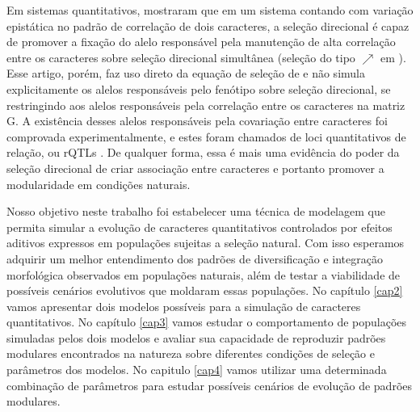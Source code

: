 Em sistemas quantitativos, \cite{Pavlicev2010} mostraram que em um
sistema contando com variação epistática no padrão de correlação de dois
caracteres, a seleção direcional é capaz de promover a fixação do alelo
responsável pela manutenção de alta correlação entre os caracteres sobre
seleção direcional simultânea  (seleção do tipo $\nearrow$ em
\cite{Jones2004}). 
Esse artigo, porém, faz uso direto da equação de seleção de
\cite{Lande1979} e não simula explicitamente os alelos responsáveis pelo
fenótipo sobre seleção direcional, se restringindo aos alelos
responsáveis pela correlação entre os caracteres na matriz G. 
A existência desses alelos responsáveis pela covariação entre caracteres foi
comprovada experimentalmente, e estes foram chamados de loci
quantitativos de relação, ou rQTLs \citep{Pavlicev2008a}. 
De qualquer forma, essa é mais uma evidência do poder da seleção
direcional de criar associação entre caracteres e portanto promover a
modularidade em condições naturais. 

Nosso objetivo neste trabalho foi estabelecer uma técnica de modelagem
que permita simular a evolução de caracteres quantitativos controlados
por efeitos aditivos expressos em populações sujeitas a seleção natural. 
Com isso esperamos adquirir um melhor entendimento dos padrões de
diversificação e integração morfológica observados em populações
naturais, além de testar a viabilidade de possíveis cenários
evolutivos que moldaram essas populações. 
No capítulo \ref{cap2} vamos apresentar dois modelos possíveis para a
simulação de caracteres quantitativos. 
No capítulo \ref{cap3} vamos estudar o comportamento de populações
simuladas pelos dois modelos e avaliar sua capacidade de reproduzir
padrões modulares encontrados na natureza sobre diferentes condições de
seleção e parâmetros dos modelos. 
No capitulo \ref{cap4} vamos utilizar uma determinada combinação de
parâmetros para estudar possíveis cenários de evolução de padrões
modulares. 
